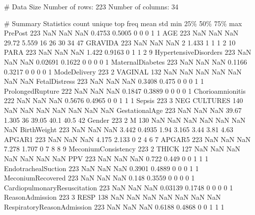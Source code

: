 \documentclass[11pt]{article}
\begin{document}
\begin{codeoutput}
\# Data Size
Number of rows: 223
Number of columns: 34

\# Summary Statistics
                              count  unique           top  freq    mean    std  min   25\%  50\%  75\%  max
PrePost                         223     NaN           NaN   NaN  0.4753 0.5005    0     0    0    1    1
AGE                             223     NaN           NaN   NaN   29.72  5.559   16    26   30   34   47
GRAVIDA                         223     NaN           NaN   NaN       2  1.433    1     1    1    2   10
PARA                            223     NaN           NaN   NaN   1.422 0.9163    0     1    1    2    9
HypertensiveDisorders           223     NaN           NaN   NaN 0.02691 0.1622    0     0    0    0    1
MaternalDiabetes                223     NaN           NaN   NaN  0.1166 0.3217    0     0    0    0    1
ModeDelivery                    223       2       VAGINAL   132     NaN    NaN  NaN   NaN  NaN  NaN  NaN
FetalDistress                   223     NaN           NaN   NaN  0.3408  0.475    0     0    0    1    1
ProlongedRupture                222     NaN           NaN   NaN  0.1847 0.3889    0     0    0    0    1
Chorioamnionitis                222     NaN           NaN   NaN  0.5676 0.4965    0     0    1    1    1
Sepsis                          223       3  NEG CULTURES   140     NaN    NaN  NaN   NaN  NaN  NaN  NaN
GestationalAge                  223     NaN           NaN   NaN   39.67  1.305   36 39.05 40.1 40.5   42
Gender                          223       2             M   130     NaN    NaN  NaN   NaN  NaN  NaN  NaN
BirthWeight                     223     NaN           NaN   NaN   3.442 0.4935 1.94 3.165 3.44 3.81 4.63
APGAR1                          223     NaN           NaN   NaN   4.175  2.133    0     2    4    6    7
APGAR5                          223     NaN           NaN   NaN   7.278  1.707    0     7    8    8    9
MeconiumConsistency             223       2         THICK   127     NaN    NaN  NaN   NaN  NaN  NaN  NaN
PPV                             223     NaN           NaN   NaN   0.722  0.449    0     0    1    1    1
EndotrachealSuction             223     NaN           NaN   NaN  0.3901 0.4889    0     0    0    1    1
MeconiumRecovered               223     NaN           NaN   NaN   0.148 0.3559    0     0    0    0    1
CardiopulmonaryResuscitation    223     NaN           NaN   NaN 0.03139 0.1748    0     0    0    0    1
ReasonAdmission                 223       3          RESP   138     NaN    NaN  NaN   NaN  NaN  NaN  NaN
RespiratoryReasonAdmission      223     NaN           NaN   NaN  0.6188 0.4868    0     0    1    1    1

\end{codeoutput}
\end{document}
